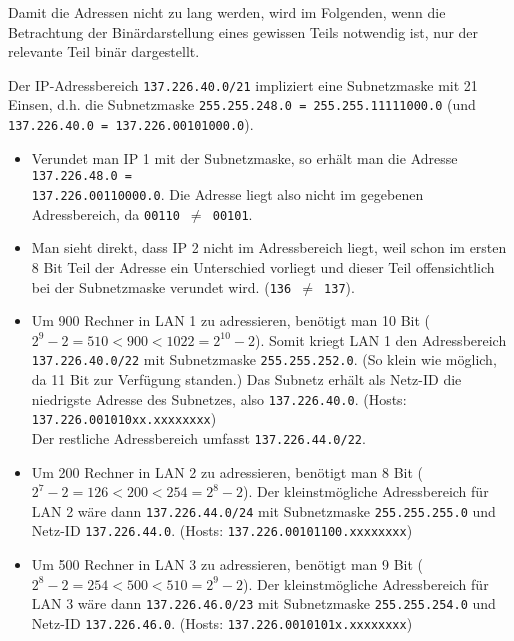 \documentclass{../exercisesheet}
\begin{document}
\begin{exercise}{4}
Damit die Adressen nicht zu lang werden, wird im Folgenden, wenn die Betrachtung der Binärdarstellung eines gewissen Teils notwendig ist, nur der relevante Teil binär dargestellt. \\
\begin{subexercise}
Der IP-Adressbereich \texttt{137.226.40.0/21} impliziert eine Subnetzmaske mit 21 Einsen, d.h. die Subnetzmaske \texttt{255.255.248.0 = 255.255.11111000.0} (und \texttt{137.226.40.0 = 137.226.00101000.0}).
\begin{itemize}
\item Verundet man IP 1 mit der Subnetzmaske, so erhält man die Adresse \texttt{137.226.48.0 = \\ 137.226.00110000.0}. Die Adresse liegt also nicht im gegebenen Adressbereich, da 
	\texttt{00110 $\neq$ 00101}.
\item Man sieht direkt, dass IP 2 nicht im Adressbereich liegt, weil schon im ersten 8 Bit Teil der Adresse ein Unterschied vorliegt und dieser Teil offensichtlich bei der Subnetzmaske verundet
	wird. (\texttt{136 $\neq$ 137}).
\end{itemize}
\end{subexercise}
\begin{subexercise}
\begin{itemize}
\item Um 900 Rechner in LAN 1 zu adressieren, benötigt man 10 Bit ($2^9 - 2 = 510 < 900 < 1022 = 2^{10}-2$). Somit kriegt LAN 1 den Adressbereich \texttt{137.226.40.0/22} mit
	Subnetzmaske \texttt{255.255.252.0}. (So klein wie möglich, da 11 Bit zur Verfügung standen.) Das Subnetz erhält als Netz-ID die niedrigste Adresse des Subnetzes, also 
	\texttt{137.226.40.0}. (Hosts: \texttt{137.226.001010xx.xxxxxxxx})
	\\ Der restliche Adressbereich umfasst \texttt{137.226.44.0/22}.
\item Um 200 Rechner in LAN 2 zu adressieren, benötigt man 8 Bit ($2^7 - 2 = 126 < 200 < 254 = 2^8-2$). Der kleinstmögliche Adressbereich für LAN 2 wäre dann 
	\texttt{137.226.44.0/24} mit Subnetzmaske \texttt{255.255.255.0} und Netz-ID \texttt{137.226.44.0}. (Hosts: \texttt{137.226.00101100.xxxxxxxx})
\item Um 500 Rechner in LAN 3 zu adressieren, benötigt man 9 Bit ($2^8 - 2 = 254 < 500 < 510 = 2^9-2$). Der kleinstmögliche Adressbereich für LAN 3 wäre dann 
	\texttt{137.226.46.0/23} mit Subnetzmaske \texttt{255.255.254.0} und Netz-ID \texttt{137.226.46.0}. (Hosts: \texttt{137.226.0010101x.xxxxxxxx})

\end{itemize}
\end{subexercise}
\end{exercise}
\end{document}
